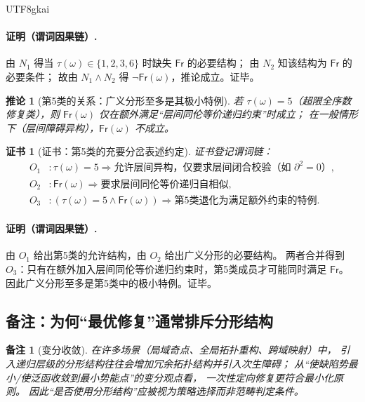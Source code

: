 \documentclass[12pt]{article}
\newtheorem{corollary}{推论}[section]
\newtheorem{remark}{备注}[section]
\newtheorem{Certificate}{证书}[section]
\newcommand{\KouJing}{\texorpdfstring{表述约定}{表述约定}}
\begin{document}
\begin{CJK*}{UTF8}{gkai}
\paragraph{证明（谓词因果链）.}
由 $N_1$ 得当 $\tau(\omega)\in\{1,2,3,6\}$ 时缺失 $\mathsf{Fr}$ 的必要结构；
由 $N_2$ 知该结构为 $\mathsf{Fr}$ 的必要条件；
故由 $N_1\wedge N_2$ 得 $\neg\mathsf{Fr}(\omega)$，推论成立。证毕。

\begin{corollary}[第5类的关系：广义分形至多是其极小特例]
\label{cor:tex29-transfinite-fractal-special}
若 $\tau(\omega)=5$（超限全序数修复类），则 $\mathsf{Fr}(\omega)$ 仅在额外满足“层间同伦等价递归约束”时成立；
在一般情形下（层间障碍异构），$\mathsf{Fr}(\omega)$ 不成立。
\end{corollary}

\begin{Certificate}[证书：第5类的充要分岔\KouJing]
\label{cert:tex29-transfinite-fractal-special}
证书登记谓词链：
\[
\begin{aligned}
  O_1 &: \tau(\omega)=5\Rightarrow \text{允许层间异构，仅要求层间闭合校验（如 }\partial^2=0\text{）},\\
  O_2 &: \mathsf{Fr}(\omega)\Rightarrow \text{要求层间同伦等价递归自相似},\\
  O_3 &: (\tau(\omega)=5\wedge \mathsf{Fr}(\omega))\Rightarrow \text{第5类退化为满足额外约束的特例}.
\end{aligned}
\]
\end{Certificate}

\paragraph{证明（谓词因果链）.}
由 $O_1$ 给出第5类的允许结构，由 $O_2$ 给出广义分形的必要结构。
两者合并得到 $O_3$：只有在额外加入层间同伦等价递归约束时，第5类成员才可能同时满足 $\mathsf{Fr}$。
因此广义分形至多是第5类中的极小特例。证毕。

\subsection{备注：为何“最优修复”通常排斥分形结构}
\label{subsec:tex29-remarks-optimality}

\begin{remark}[变分收敛]
在许多场景（局域奇点、全局拓扑重构、跨域映射）中，
引入递归层级的分形结构往往会增加冗余拓扑结构并引入次生障碍；
从“使缺陷势最小/使泛函收敛到最小势能点”的变分观点看，
一次性定向修复更符合最小化原则。
因此“是否使用分形结构”应被视为\emph{策略选择}而非\emph{范畴判定条件}。
\end{remark}


\end{CJK*}
\end{document}
